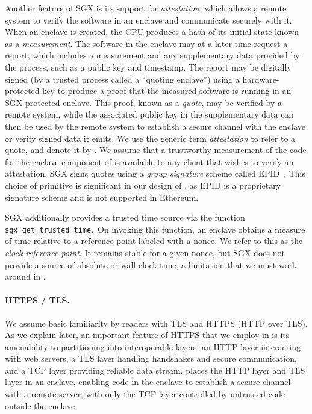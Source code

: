 Another feature of SGX is its support for \emph{attestation}, which allows a remote system to verify the software in an enclave and communicate securely with it. When an enclave is created, the CPU produces a hash of its initial state known as a {\em measurement}. The software in the enclave may at a later time request a report, which includes a measurement and any supplementary data provided by the process, such as a public key and timestamp. The report may be digitally signed (by a trusted process called a ``quoting enclave'') using a hardware-protected key to produce a proof that the measured software is running in an SGX-protected enclave. This proof, known as a {\em quote}, may be verified by a remote system, while the associated public key in the supplementary data can then be used by the remote system to establish a secure channel with the enclave or verify signed data it emits. We use the generic term {\em attestation} to refer to a quote, and denote it by \att. We assume that a trustworthy measurement of the code for the enclave component of \tc is available to any client that wishes to verify an attestation. SGX signs quotes using a \emph{group signature} scheme called EPID~\cite{}. This choice of primitive is significant in our design of \tcs, as EPID is a proprietary signature scheme and is not supported in Ethereum.

SGX additionally provides a trusted time source via the function \texttt{sgx\_get\_trusted\_time}.~On invoking this function, an enclave obtains a measure of time relative to a reference point labeled with a nonce. We refer to this as the \emph{clock reference point}. It remains stable for a given nonce, but SGX does not provide a source of absolute or wall-clock time, a limitation that we must work around in \tc.

\paragraph{\bf HTTPS / TLS.}

We assume basic familiarity by readers with TLS and HTTPS (HTTP over TLS). As we explain later, an important feature of HTTPS that we employ in \tc is its amenability to partitioning into interoperable layers: an HTTP layer interacting with web servers, a TLS layer handling handshakes and secure communication, and a TCP layer providing reliable data stream. \tc places the HTTP layer and TLS layer in an enclave, enabling code in the enclave to establish a secure channel with a remote server, with only the TCP layer controlled by untrusted code outside the enclave. 


